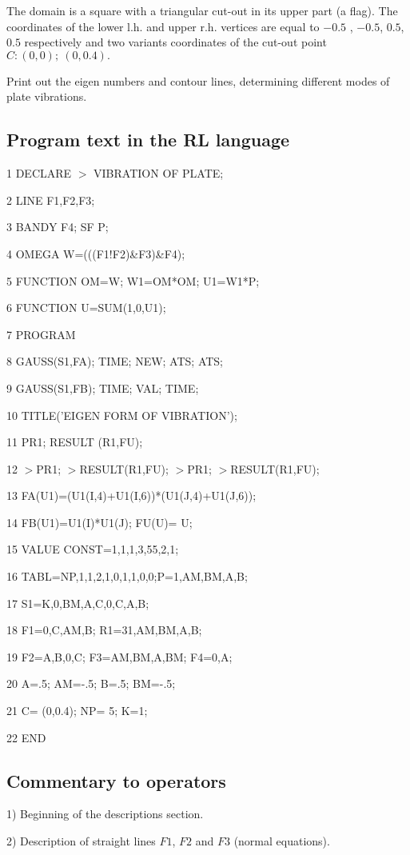 The domain is a square with a triangular cut-out in its upper part (a flag).
The coordinates of the lower l.h. and upper r.h. vertices are equal to $-0.5$%
, $-0.5$, $0.5$, $0.5$ respectively and two variants coordinates of the
cut-out point $C:(0,0);\ (0,0.4).$

Print out the eigen numbers and contour lines, determining different modes
of plate vibrations.

\subsection{ Program text in the RL language}

1 DECLARE $>$ VIBRATION OF PLATE;

2 LINE F1,F2,F3;

3 BANDY F4; SF P;

4 OMEGA W=(((F1!F2)\&F3)\&F4);

5 FUNCTION OM=W; W1=OM*OM; U1=W1*P;

6 FUNCTION U=SUM(1,0,U1);

7 PROGRAM

8 GAUSS(S1,FA); TIME; NEW; ATS; ATS;

9 GAUSS(S1,FB); TIME; VAL; TIME;

10 TITLE('EIGEN FORM OF VIBRATION');

11 PR1; RESULT (R1,FU);

12 $>$PR1; $>$RESULT(R1,FU); $>$PR1; $>$RESULT(R1,FU);

13 FA(U1)=(U1(I,4)+U1(I,6))*(U1(J,4)+U1(J,6));

14 FB(U1)=U1(I)*U1(J); FU(U)= U;

15 VALUE CONST=1,1,1,3,55,2,1;

16 TABL=NP,1,1,2,1,0,1,1,0,0;P=1,AM,BM,A,B;

17 S1=K,0,BM,A,C,0,C,A,B;

18 F1=0,C,AM,B; R1=31,AM,BM,A,B;

19 F2=A,B,0,C; F3=AM,BM,A,BM; F4=0,A;

20 A=.5; AM=-.5; B=.5; BM=-.5;

21 C= (0,0.4); NP= 5; K=1;

22 END

\subsection{Commentary to operators}

1) Beginning of the descriptions section.

2) Description of straight lines $F1$, $F2$ and $F3$ (normal equations).

